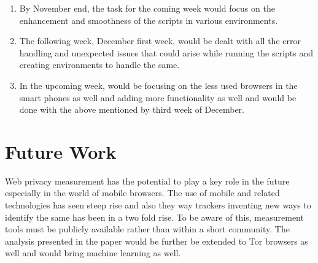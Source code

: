 \documentclass[journal]{IEEEtran}
\begin{document}
\begin{enumerate}
\item By November end, the task for the coming week would focus on the enhancement and smoothness of the scripts in various environments. 
\item The following week, December first week, would be dealt with all the error handling and unexpected issues that could arise while running the scripts and creating environments to handle the same.
\item In the upcoming week, would be focusing on the less used browsers in the smart phones as well and adding more functionality as well and would be done with the above mentioned by third week of December.
\end{enumerate}

\section{Future Work}

Web privacy measurement has the potential to play a key role in the future especially in the world of mobile browsers. The use of mobile and related technologies has seen steep rise and also they way trackers inventing new ways to identify the same has been in a two fold rise. To be aware of this, measurement tools must be publicly available rather than within a short community. The analysis presented in the paper would be further be extended to Tor browsers as well and would bring machine learning as well.

%
%
\end{document}
